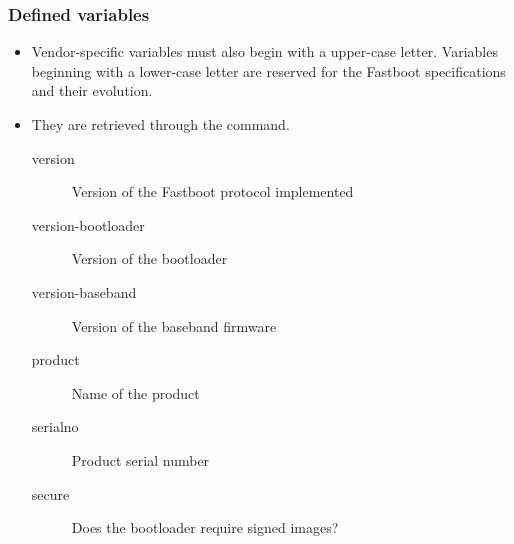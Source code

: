 \begin{frame}
  \frametitle{Defined variables}
  \begin{itemize}
  \item Vendor-specific variables must also begin with a upper-case
    letter. Variables beginning with a lower-case letter are reserved
    for the Fastboot specifications and their evolution.
  \item They are retrieved through the  command.
    \begin{description}
    \item[version] Version of the Fastboot protocol implemented
    \item[version-bootloader] Version of the bootloader
    \item[version-baseband] Version of the baseband firmware
    \item[product] Name of the product
    \item[serialno] Product serial number
    \item[secure] Does the bootloader require signed images?
    \end{description}
  \end{itemize}
\end{frame}
